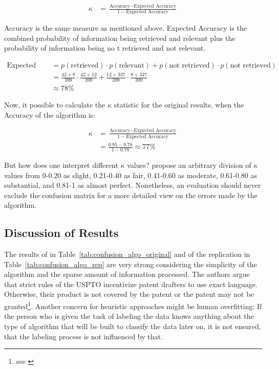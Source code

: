 \documentclass[12pt, a4paper, abstract, parskip]{scrartcl}
\theoremstyle{definition}
\begin{document}
\begin{align*}
\kappa &= \frac{\text{Accuracy} - \text{Expected Accuracy}}{1- \text{Expected Accuracy}}
\end{align*}

Accuracy is the same measure as mentioned above. Expected Accuracy is the
combined probability of information being retrieved and relevant plus the
probability of information being no t retrieved and not relevant.

\begin{align*}
\text{Expected Accuracy} &= p(\text{retrieved})\cdot p(\text{relevant}) + p(\text{not retrieved}) \cdot p(\text{not retrieved})\\
&= \frac{42 + 8}{399}\cdot\frac{42 + 12}{399} + \frac{12 + 337}{399}\cdot\frac{8+337}{399}\\
&\approx 78\%
\end{align*}

Now, it possible to calculate the $\kappa$ statistic for the original results,
when the Accuracy of the algorithm is:

\begin{align*}
\kappa &= \frac{\text{Accuracy} - \text{Expected Accuracy}}{1- \text{Expected Accuracy}}\\
&= \frac{0.95 - 0.78}{1-0.78} \approx 77\%
\end{align*}

But how does one interpret different $\kappa$ values?
\citet[p.~8]{landis1977measurement} propose an arbitrary division of $\kappa$
values from 0-0.20 as slight, 0.21-0.40 as fair, 0.41-0.60 as moderate,
0.61-0.80 as substantial, and 0.81-1 as almost perfect. Nonetheless, an
evaluation should never exclude the confusion matrix for a more detailed view
on the errors made by the algorithm.

\subsection{Discussion of Results} %
\label{ssub:discussion_of_results}

The results of \citet{bessen2007empirical} in
Table~\ref{tab:confusion_algo_original} and of the replication in
Table~\ref{tab:confusion_algo_rep} are very strong considering the simplicity
of the algorithm and the sparse amount of information processed. The authors
argue that strict rules of the USPTO incentivize patent drafters to use exact
language. Otherwise, their product is not covered by the patent or the patent
may not be granted\footnote{see \citet[pp.~7-9]{bessen2007empirical}}. Another
concern for heuristic approaches might be human overfitting: If the person who
is given the task of labeling the data knows anything about the type of
algorithm that will be built to classify the data later on, it is not ensured,
that the labeling process is not influenced by that.
\end{document}
